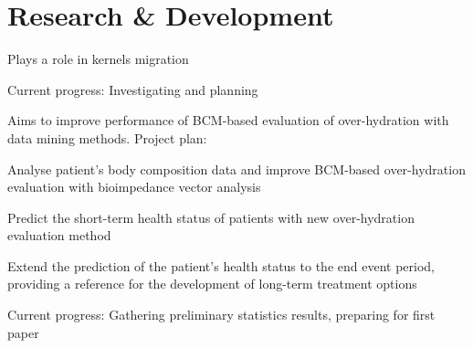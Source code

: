 \documentclass[]{deedy-resume-openfont}
\begin{document}
\begin{minipage}[t]{0.73\textwidth} 


\section{Research \& Development}
\descript{}
\vspace{\topsep}
\begin{tightemize}
    \item Plays a role in kernels migration
    \item Current progress: Investigating and planning
\end{tightemize}
\sectionsep

\descript{}
\begin{tightemize}
\item Aims to improve performance of BCM-based evaluation of over-hydration with data mining methods. Project plan:
        \vspace{\topsep}
        \begin{tightemize}
            \item Analyse patient's body composition data and improve BCM-based over-hydration evaluation with bioimpedance vector analysis
            \item Predict the short-term health status of patients with new over-hydration evaluation method
            \item Extend the prediction of the patient's health status to the end event period, providing a reference for the development of long-term treatment options
        \end{tightemize}
        \vspace{\topsep}
		\item Current progress: Gathering preliminary statistics results, preparing for first paper
\end{tightemize}
\sectionsep


\end{minipage}
\end{document}
